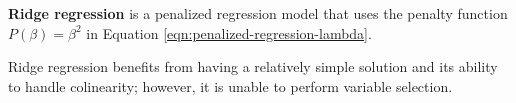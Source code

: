 \documentclass{article}
\newcommand{\argmin}[2]{\underset{#1}{\text{arg min}}\left\{#2\right\}}
\begin{document}

	
	\textbf{Ridge regression} is a penalized regression model that uses the penalty function $P(\beta) = \beta^2$ \cite{hoerl1970ridge} in Equation \ref{eqn:penalized-regression-lambda}. 

	Ridge regression benefits from having a relatively simple solution and its ability to handle colinearity; however, it is unable to perform variable selection.
	
\end{document}
